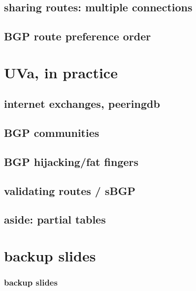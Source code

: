 \subsection{sharing routes: multiple connections}


\subsection{BGP route preference order}

\section{UVa, in practice}


\subsection{internet exchanges, peeringdb}


\subsection{BGP communities}


\subsection{BGP hijacking/fat fingers}


\subsection{validating routes / sBGP}



\subsection{aside: partial tables}


\section{backup slides}
\begin{frame}\frametitle{backup slides}
\end{frame}



